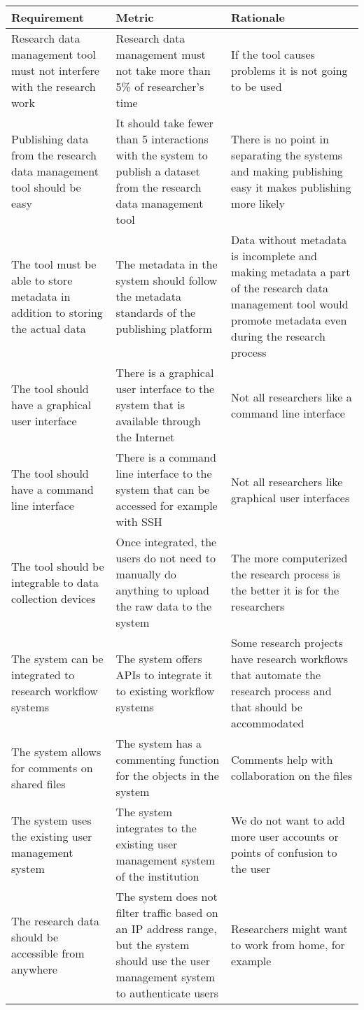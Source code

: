 \tabcolsep=0.11cm
\begin{tabularx}{\textwidth}{| >{\raggedright}p{3cm} | >{\raggedright}p{3cm} | X |}
    \hline
    \textbf{Requirement} & \textbf{Metric}& \textbf{Rationale} \\
    \hline
    \rowcolor{Gray}
    Research data management tool must not interfere with the research work    &Research data management must not take more than 5\% of researcher’s time & If the tool causes problems it is not going to be used\\
    \hline
    Publishing data from the research data management tool should be easy&It should take fewer than 5 interactions with the system to publish a dataset from the research data management tool &There is no point in separating the systems and making publishing easy it makes publishing more likely\\
    \hline
    \rowcolor{Gray}
    The tool must be able to store metadata in addition to storing the actual data  &The metadata in the system should follow the metadata standards of the publishing platform&Data without metadata is incomplete and making metadata a part of the research data management tool would promote metadata even during the research process\\
    \hline
    The tool should have a graphical user interface  &There is a graphical user interface to the system that is available through the Internet & Not all researchers like a command line interface\\
    \hline
    \rowcolor{Gray}
    The tool should have a command line interface        &There is a command line interface to the system that can be accessed for example with SSH & Not all researchers like graphical user interfaces\\
    \hline
    The tool should be integrable to data collection devices  & Once integrated, the users do not need to manually do anything to upload the raw data to the system & The more computerized the research process is the better it is for the researchers\\
    \hline
    \rowcolor{Gray}
    The system can be integrated to research workflow systems   &The system offers APIs to integrate it to existing workflow systems& Some research projects have research workflows that automate the research process and that should be accommodated\\
    \hline
    The system allows for comments on shared files &The system has a commenting function for the objects in the system & Comments help with collaboration on the files\\
    \hline
    \rowcolor{Gray}
    The system uses the existing user management system &The system integrates to the existing user management system of the institution &We do not want to add more user accounts or points of confusion to the user\\
    \hline
    The research data should be accessible from anywhere  &The system does not filter traffic based on an IP address range, but the system should use the user management system to authenticate users  & Researchers might want to work from home, for example\\
    \hline
\end{tabularx}

